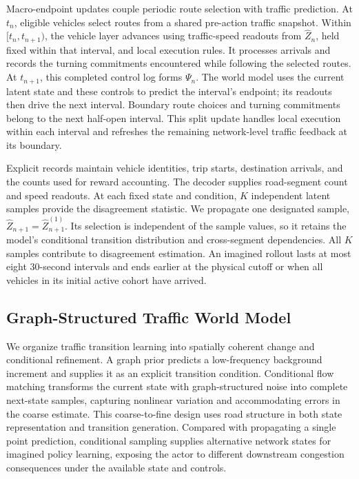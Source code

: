 Macro-endpoint updates couple periodic route selection with traffic
prediction. At $t_n$, eligible vehicles select routes from a shared
pre-action traffic snapshot. Within $[t_n,t_{n+1})$, the vehicle layer
advances using traffic-speed readouts from $\widehat Z_n$, held fixed
within that interval, and local execution rules. It processes arrivals
and records the turning commitments encountered while following the
selected routes. At $t_{n+1}$, this completed control log forms $\Psi_n$.
The world model uses the current latent state and these controls to
predict the interval's endpoint; its readouts then drive the next interval.
Boundary route choices and turning commitments belong to the next
half-open interval. This split update handles local execution within
each interval and refreshes the remaining network-level traffic feedback
at its boundary.

Explicit records maintain vehicle identities, trip starts, destination
arrivals, and the counts used for reward accounting. The decoder supplies
road-segment count and speed readouts. At each fixed state and condition,
$K$ independent latent samples provide the disagreement statistic.
We propagate one designated sample,
$\widehat Z_{n+1}=\widehat Z_{n+1}^{(1)}$.
Its selection is independent of the sample values, so it retains the
model's conditional transition distribution and cross-segment dependencies.
All $K$ samples contribute to disagreement estimation. An imagined rollout
lasts at most eight 30-second intervals and ends earlier at the physical
cutoff or when all vehicles in its initial active cohort have arrived.

\subsection{Graph-Structured Traffic World Model}
\label{sec:traffic-world-model}

We organize traffic transition learning into spatially coherent change
and conditional refinement. A graph prior predicts a low-frequency
background increment and supplies it as an explicit transition condition.
Conditional flow matching transforms the current state with
graph-structured noise into complete next-state samples, capturing
nonlinear variation and accommodating errors in the coarse estimate.
This coarse-to-fine design uses road structure in both state representation
and transition generation. Compared with propagating a single point
prediction, conditional sampling supplies alternative network states for
imagined policy learning, exposing the actor to different downstream
congestion consequences under the available state and controls.

